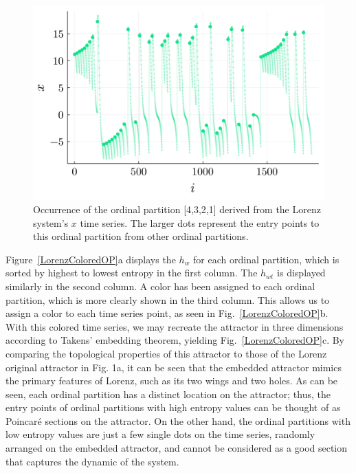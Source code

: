 \documentclass[%
 aip,
 amsmath,amssymb,
 reprint,%
]{revtex4-1}
\begin{document}
\begin{figure}[htbp]
\centerline{\includegraphics[width=\linewidth]{a_LorenzTimeSeries_descending.png}}
\caption{Occurrence of the ordinal partition [4,3,2,1] derived from the Lorenz system's $x$ time series. The larger dots represent the entry points to this ordinal partition from other ordinal partitions.}
\label{a_LorenzTimeSeries_descending}
\end{figure}

Figure~\ref{LorenzColoredOP}a displays the $h_w$ for each ordinal partition, which is sorted by highest to lowest entropy in the first column. The $h_{wt}$ is displayed similarly in the second column. A color has been assigned to each ordinal partition, which is more clearly shown in the third column. This allows us to assign a color to each time series point, as seen in Fig.~\ref{LorenzColoredOP}b. With this colored time series, we may recreate the attractor in three dimensions according to Takens' embedding theorem, yielding Fig.~\ref{LorenzColoredOP}c. By comparing the topological properties of this attractor to those of the Lorenz original attractor in Fig. 1a,
it can be seen that the embedded attractor mimics the primary features of Lorenz, such as its two wings and two holes. As can be seen, each ordinal partition has a distinct location on the attractor; thus, the entry points of ordinal partitions with high entropy values can be thought of as Poincar\'e sections on the attractor. On the other hand, the ordinal partitions with low entropy values are just a few single dots on the time series, randomly arranged on the embedded attractor, and cannot be considered as a good section that captures the dynamic of the system.
\end{document}
